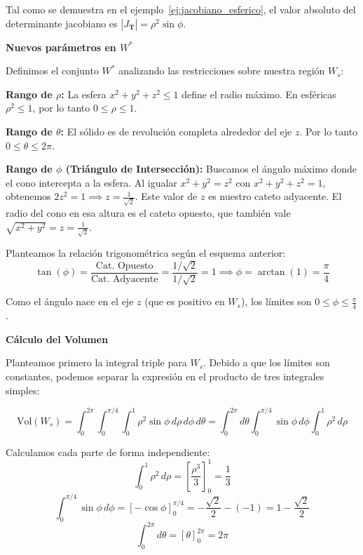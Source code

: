 Tal como se demuestra en el ejemplo~\ref{ej:jacobiano_esferico}, el valor absoluto del determinante jacobiano es $|J_{\mathbf{T}}| = \rho^2 \sin \phi$.

\vspace{0.3cm}
\textbf{Nuevos parámetros en $W^*$}

Definimos el conjunto $W^*$ analizando las restricciones sobre nuestra región $W_s$:

\textbf{Rango de $\rho$:} La esfera $x^2 + y^2 + z^2 \leq 1$ define el radio máximo. En esféricas $\rho^2 \leq 1$, por lo tanto $0 \leq \rho \leq 1$.

\textbf{Rango de $\theta$:} El sólido es de revolución completa alrededor del eje $z$. Por lo tanto $0 \leq \theta \leq 2\pi$.

\textbf{Rango de $\phi$ (Triángulo de Intersección):} Buscamos el ángulo máximo donde el cono intercepta a la esfera. Al igualar $x^2 + y^2 = z^2$ con $x^2 + y^2 + z^2 = 1$, obtenemos $2z^2 = 1 \implies z = \frac{1}{\sqrt{2}}$. Este valor de $z$ es nuestro cateto adyacente. El radio del cono en esa altura es el cateto opuesto, que también vale $\sqrt{x^2+y^2} = z = \frac{1}{\sqrt{2}}$.

\begin{figure}[htbp]
    \centering
     
    \label{fig:triangulo de interseccion}
\end{figure}

Planteamos la relación trigonométrica según el esquema anterior:
\[
    \tan(\phi) = \frac{\text{Cat. Opuesto}}{\text{Cat. Adyacente}} = \frac{1/\sqrt{2}}{1/\sqrt{2}} = 1 \implies \phi = \arctan(1) = \frac{\pi}{4}
\]
    
Como el ángulo nace en el eje $z$ (que es positivo en $W_s$), los límites son $0 \leq \phi \leq \frac{\pi}{4}$.

\vspace{0.3cm}
\textbf{Cálculo del Volumen}

Planteamos primero la integral triple para $W_s$. Debido a que los límites son constantes, podemos separar la expresión en el producto de tres integrales simples:

\[
    \text{Vol}(W_s) = \int_{0}^{2\pi} \int_{0}^{\pi/4} \int_{0}^{1} \rho^2 \sin \phi \, d\rho \, d\phi \, d\theta = \int_{0}^{2\pi} d\theta \int_{0}^{\pi/4} \sin \phi \, d\phi \int_{0}^{1} \rho^2 \, d\rho
\]

Calculamos cada parte de forma independiente:
\[ \int_{0}^{1} \rho^2 \, d\rho = \left[ \frac{\rho^3}{3} \right]_{0}^{1} = \frac{1}{3} \]
\[ \int_{0}^{\pi/4} \sin \phi \, d\phi = \left[ -\cos \phi \right]_{0}^{\pi/4} = -\frac{\sqrt{2}}{2} - (-1) = 1 - \frac{\sqrt{2}}{2} \]
\[ \int_{0}^{2\pi} d\theta = \left[ \theta \right]_{0}^{2\pi} = 2\pi \]

